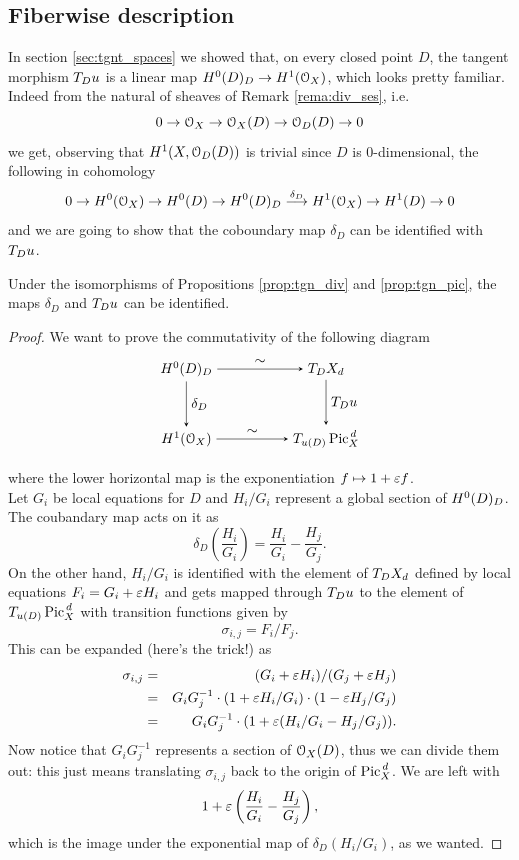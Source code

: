 	\subsection{Fiberwise description}
		In section \ref{sec:tgnt_spaces} we showed that, on every closed point $D$, the tangent morphism $T_D u$ is a linear map $H^0(D)_D\to H^1(\mathcal{O}_X)$, which looks pretty familiar. Indeed from the natural \ses	of sheaves of Remark \ref{rema:div_ses}, i.e.
		$$ 0 \to \mathcal{O}_X \to \mathcal{O}_X(D) \to \mathcal{O}_D(D) \to 0 $$
		we get, observing that $H^1(X,\mathcal{O}_D(D))$ is trivial since $D$ is $0$-dimensional, the following \les in cohomology
		\begin{equation}\label{eq:abel_les}
			0\to H^0(\mathcal{O}_X) \to H^0(D) \to H^0(D)_D \overset{\delta_D}\longrightarrow H^1(\mathcal{O}_X) \to H^1(D) \to 0
		\end{equation}
		and we are going to show that the coboundary map $\delta_D$ can be identified with $T_D u$.
		\begin{prop}\label{prop:delta_u}
			Under the isomorphisms of Propositions \ref{prop:tgn_div} and \ref{prop:tgn_pic}, the maps $\delta_D$ and $T_D u$ can be identified.
		\end{prop}
		\begin{proof}
			We want to prove the commutativity of the following diagram
			$$
			\begin{tikzpicture}[node distance=5em, auto]
				\node (A) 									{$\HDD$};
				\node (A2) 	[right of=A]		{$\;$};
				\node (B) 	[right of=A2]		{$T_D \Dd$};
			  \node (C) 	[below of=A]	 	{$H^1(\OX)$};
				\node (C2) 	[below of=A2]		{$\;$};
			  \node (D) 	[below of=B] 		{$T_{u(D)} \Pd$};
			  \draw[-stealth] 				(A)		to node {$\sim$} 				(B);
			  \draw[-stealth]					(C)		to node {$\sim$} 				(D);
			  \draw[-stealth]					(A)		to node {$\delta_D$} 	(C);
			  \draw[-stealth]					(B)		to node {$\TDu$} 			(D);
			\end{tikzpicture}
			$$
			where the lower horizontal map is the exponentiation $f\mapsto 1+\varepsilon f$.\\
			Let $G_i$ be local equations for $D$ and $H_i/G_i$ represent a global section of $H^0(D)_D$. The coubandary map acts on it as
			$$ \delta_D\left(\frac{H_i}{G_i}\right) =  \frac{H_i}{G_i}-\frac{H_j}{G_j}. $$
			On the other hand, $H_i/G_i$ is identified with the element of $T_D X_d$ defined by local equations $F_i = G_i + \varepsilon H_i$ and gets mapped through $T_D u$ to the element of $T_{u(D)} \operatorname{Pic}^{\,d}_X$ with transition functions given by
			$$ \sigma_{i,j} = F_i / F_j. $$
			This can be expanded (here's the trick!) as
			\begin{eqnarray*}
				\sigma_{i,j} &=& (G_i + \varepsilon H_i)/(G_j + \varepsilon H_j) \\
				&=& G_i G_j^{-1}\cdot(1+\varepsilon H_i/G_i)\cdot(1-\varepsilon H_j/G_j) \\
				&=& G_i G_j^{-1}\cdot(1+\varepsilon (H_i/G_i - H_j/G_j)).
			\end{eqnarray*}
			Now notice that $G_i G_j^{-1}$ represents a section of $\mathcal{O}_X(D)$, thus we can divide them out: this just means translating $\sigma_{i,j} $ back to the origin of $ \operatorname{Pic}^{\,d}_X$. We are left with
			$$ 1 + \varepsilon\left( \frac{H_i}{G_i}-\frac{H_j}{G_j} \right), $$
			which is the image under the exponential map of $\delta_D(H_i/G_i)$, as we wanted.
		\end{proof}
